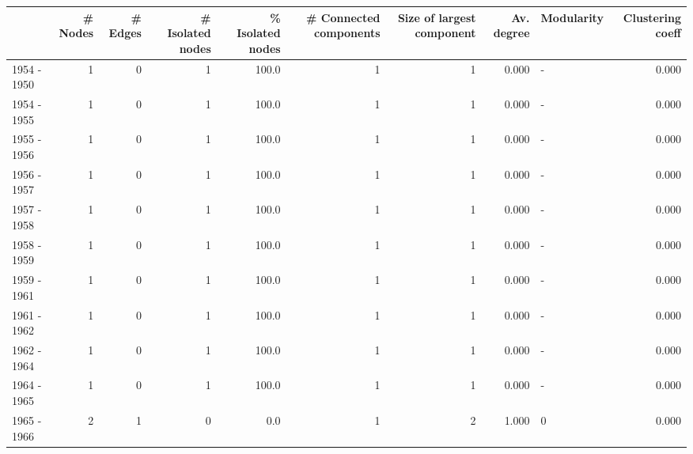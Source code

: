 \begin{tabular}{lrrrrrrrlr}
\toprule
{} &  \# Nodes &  \# Edges &  \# Isolated nodes &  \% Isolated nodes &  \# Connected components &  Size of largest component &  Av. degree & Modularity &  Clustering coeff \\
\midrule
1954 - 1950 &        1 &        0 &                 1 &             100.0 &                       1 &                          1 &       0.000 &          - &             0.000 \\
1954 - 1955 &        1 &        0 &                 1 &             100.0 &                       1 &                          1 &       0.000 &          - &             0.000 \\
1955 - 1956 &        1 &        0 &                 1 &             100.0 &                       1 &                          1 &       0.000 &          - &             0.000 \\
1956 - 1957 &        1 &        0 &                 1 &             100.0 &                       1 &                          1 &       0.000 &          - &             0.000 \\
1957 - 1958 &        1 &        0 &                 1 &             100.0 &                       1 &                          1 &       0.000 &          - &             0.000 \\
1958 - 1959 &        1 &        0 &                 1 &             100.0 &                       1 &                          1 &       0.000 &          - &             0.000 \\
1959 - 1961 &        1 &        0 &                 1 &             100.0 &                       1 &                          1 &       0.000 &          - &             0.000 \\
1961 - 1962 &        1 &        0 &                 1 &             100.0 &                       1 &                          1 &       0.000 &          - &             0.000 \\
1962 - 1964 &        1 &        0 &                 1 &             100.0 &                       1 &                          1 &       0.000 &          - &             0.000 \\
1964 - 1965 &        1 &        0 &                 1 &             100.0 &                       1 &                          1 &       0.000 &          - &             0.000 \\
1965 - 1966 &        2 &        1 &                 0 &               0.0 &                       1 &                          2 &       1.000 &          0 &             0.000 \\

\end{tabular}
